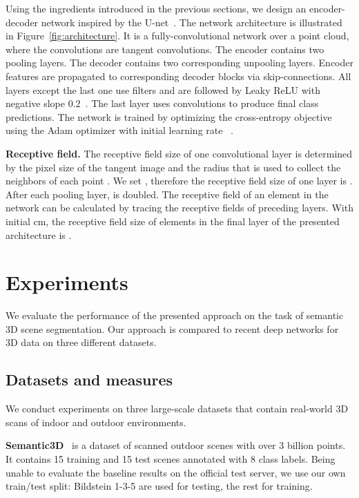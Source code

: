 \documentclass[10pt,twocolumn,letterpaper]{article}
\newcommand\mypara[1]{\vspace{1mm}\noindent\textbf{#1}}
\begin{document}
Using the ingredients introduced in the previous sections, we design an encoder-decoder network inspired by the U-net~\cite{Ronneberger2015}. The network architecture is illustrated in Figure~\ref{fig:architecture}.
It is a fully-convolutional network over a point cloud, where the convolutions are tangent convolutions. The encoder contains two pooling layers. The decoder contains two corresponding unpooling layers.
Encoder features are propagated to corresponding decoder blocks via skip-connections.
All layers except the last one use  filters and are followed by Leaky ReLU with negative slope 0.2~\cite{Maas2013}.
The last layer uses  convolutions to produce final class predictions.
The network is trained by optimizing the cross-entropy objective using the Adam optimizer with initial learning rate ~\cite{KingmaBa2015}.

\mypara{Receptive field.}
The receptive field size of one convolutional layer is determined by the pixel size  of the tangent image and the radius  that is used to collect the neighbors of each point . We set , therefore the receptive field size of one layer is .
After each pooling layer,  is doubled.
The receptive field of an element in the network can be calculated by tracing the receptive fields of preceding layers.
With initial cm, the receptive field size of elements in the final layer of the presented architecture is .
 
\section{Experiments}
\label{sec:results}
We evaluate the performance of the presented approach on the task of semantic 3D scene segmentation. Our approach is compared to recent deep networks for 3D data on three different datasets.


\subsection{Datasets and measures}

We conduct experiments on three large-scale datasets that contain real-world 3D scans of indoor and outdoor environments.

\mypara{Semantic3D}~\cite{hackel17} is a dataset of scanned outdoor scenes with over 3 billion points.
It contains 15 training and 15 test scenes annotated with 8 class labels.
Being unable to evaluate the baseline results on the official test server, we use our own train/test split:
Bildstein 1-3-5 are used for testing, the rest for training.
\end{document}
